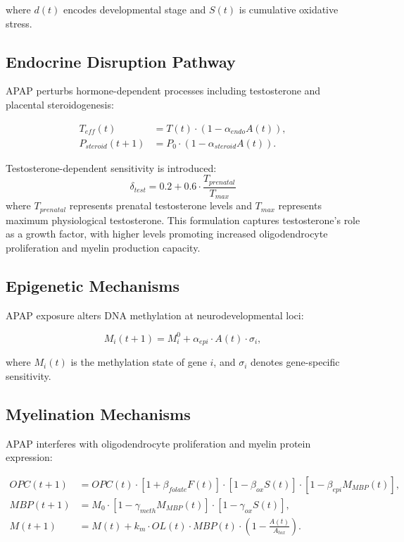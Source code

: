 \documentclass[11pt]{article}
\let\oldsubsection\subsection
\renewcommand{\subsection}[1]{\oldsubsection{#1}\setlength{\leftskip}{0.75em}}
\begin{document}
where $d(t)$ encodes developmental stage and $S(t)$ is cumulative oxidative stress.

\subsection{Endocrine Disruption Pathway}
APAP perturbs hormone-dependent processes including testosterone and placental steroidogenesis:

\begin{align}
T_{eff}(t) &= T(t) \cdot \left(1 - \alpha_{endo}A(t)\right), \\
P_{steroid}(t+1) &= P_0 \cdot \left(1 - \alpha_{steroid}A(t)\right).
\end{align}


Testosterone-dependent sensitivity is introduced:
\[
\delta_{test} = 0.2 + 0.6 \cdot \frac{T_{prenatal}}{T_{max}}
\]
where $T_{prenatal}$ represents prenatal testosterone levels and $T_{max}$ represents maximum physiological testosterone. This formulation captures testosterone's role as a growth factor, with higher levels promoting increased oligodendrocyte proliferation and myelin production capacity.

\subsection{Epigenetic Mechanisms}
APAP exposure alters DNA methylation at neurodevelopmental loci:

\begin{equation}
M_i(t+1) = M_i^0 + \alpha_{epi} \cdot A(t) \cdot \sigma_i,
\end{equation}

where $M_i(t)$ is the methylation state of gene $i$, and $\sigma_i$ denotes gene-specific sensitivity.

\subsection{Myelination Mechanisms}
APAP interferes with oligodendrocyte proliferation and myelin protein expression:

\begin{align}
OPC(t+1) &= OPC(t) \cdot [1 + \beta_{folate}F(t)] \cdot [1 - \beta_{ox}S(t)] \cdot [1 - \beta_{epi}M_{MBP}(t)], \\
MBP(t+1) &= M_0 \cdot [1 - \gamma_{meth}M_{MBP}(t)] \cdot [1 - \gamma_{ox}S(t)], \\
M(t+1) &= M(t) + k_m \cdot OL(t) \cdot MBP(t) \cdot \left(1 - \frac{A(t)}{A_{tox}}\right).
\end{align}
\end{document}
